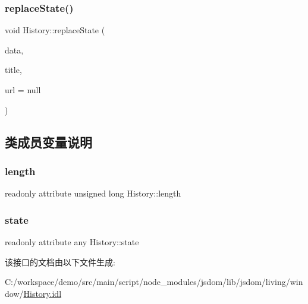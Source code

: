 \mbox{\label{interface_history_a1f18439a923e8867500357517cf91f12}} 
\subsubsection{\texorpdfstring{replace\+State()}{replaceState()}}
{\footnotesize\ttfamily void History\+::replace\+State (\begin{DoxyParamCaption}\item[{any}]{data,  }\item[{D\+O\+M\+String}]{title,  }\item[{optional D\+O\+M\+String?}]{url = {\ttfamily null} }\end{DoxyParamCaption})}



\subsection{类成员变量说明}
\mbox{\label{interface_history_a675d5c5382c9e22e685b52743493b105}} 
\subsubsection{\texorpdfstring{length}{length}}
{\footnotesize\ttfamily readonly attribute unsigned long History\+::length}

\mbox{\label{interface_history_a72b4d1c31b1a06e624332850523a337c}} 
\subsubsection{\texorpdfstring{state}{state}}
{\footnotesize\ttfamily readonly attribute any History\+::state}



该接口的文档由以下文件生成\+:\begin{DoxyCompactItemize}
\item 
C\+:/workspace/demo/src/main/script/node\+\_\+modules/jsdom/lib/jsdom/living/window/\mbox{\hyperlink{_history_8idl}{History.\+idl}}\end{DoxyCompactItemize}
